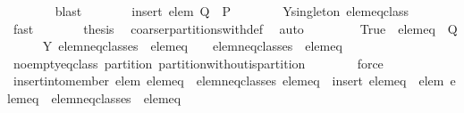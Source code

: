 \begin{isabellebody}
\ \ \ \ \ \ \isamarkupfalse%
\ blast\isanewline
\ \ \ \ \isamarkupfalse%
\ \isamarkupfalse%
\ {\isachardoublequoteopen}insert\ {\isacharbraceleft}elem{\isacharbraceright}\ {\isacharquery}Q\ {\isacharequal}\ P{\isachardoublequoteclose}\isanewline
\ \ \ \ \ \ \isamarkupfalse%
\ Y{\isacharunderscore}singleton\ elem{\isacharunderscore}eq{\isacharunderscore}class{\isacharprime}\isanewline
\ \ \ \ \ \ \isamarkupfalse%
\ fast\isanewline
\ \ \ \ \isamarkupfalse%
\ \isamarkupfalse%
\ {\isacharquery}thesis\ \isamarkupfalse%
\ coarser{\isacharunderscore}partitions{\isacharunderscore}with{\isacharunderscore}def\ \isamarkupfalse%
\ auto\isanewline
\ \ \isamarkupfalse%
\isanewline
\ \ \ \ \isamarkupfalse%
\ True{\isacharcolon}\ {\isachardoublequoteopen}{\isasymnot}\ {\isacharquery}elem{\isacharunderscore}eq\ {\isasymnotin}\ {\isacharquery}Q{\isachardoublequoteclose}\isanewline
\ \ \ \ \isamarkupfalse%
\ Y{\isacharprime}{\isacharcolon}\ {\isachardoublequoteopen}{\isacharquery}elem{\isacharunderscore}neq{\isacharunderscore}classes\ {\isasymunion}\ {\isacharbraceleft}{\isacharquery}elem{\isacharunderscore}eq{\isacharbraceright}\ {\isacharminus}\ {\isacharbraceleft}{\isacharbraceleft}{\isacharbraceright}{\isacharbraceright}\ {\isacharequal}\ {\isacharquery}elem{\isacharunderscore}neq{\isacharunderscore}classes\ {\isasymunion}\ {\isacharbraceleft}{\isacharquery}elem{\isacharunderscore}eq{\isacharbraceright}{\isachardoublequoteclose}\isanewline
\ \ \ \ \ \ \isamarkupfalse%
\ no{\isacharunderscore}empty{\isacharunderscore}eq{\isacharunderscore}class\ partition\ partition{\isacharunderscore}without{\isacharunderscore}is{\isacharunderscore}partition\isanewline
\ \ \ \ \ \ \isamarkupfalse%
\ force\isanewline
\ \ \ \ \isamarkupfalse%
\ {\isachardoublequoteopen}insert{\isacharunderscore}into{\isacharunderscore}member\ elem\ {\isacharparenleft}{\isacharbraceleft}{\isacharquery}elem{\isacharunderscore}eq{\isacharbraceright}\ {\isasymunion}\ {\isacharquery}elem{\isacharunderscore}neq{\isacharunderscore}classes{\isacharparenright}\ {\isacharquery}elem{\isacharunderscore}eq\ {\isacharequal}\ insert\ {\isacharparenleft}{\isacharquery}elem{\isacharunderscore}eq\ {\isasymunion}\ {\isacharbraceleft}elem{\isacharbraceright}{\isacharparenright}\ {\isacharparenleft}{\isacharparenleft}{\isacharbraceleft}{\isacharquery}elem{\isacharunderscore}eq{\isacharbraceright}\ {\isasymunion}\ {\isacharquery}elem{\isacharunderscore}neq{\isacharunderscore}classes{\isacharparenright}\ {\isacharminus}\ {\isacharbraceleft}{\isacharquery}elem{\isacharunderscore}eq{\isacharbraceright}{\isacharparenright}{\isachardoublequoteclose}\isanewline

\end{isabellebody}
